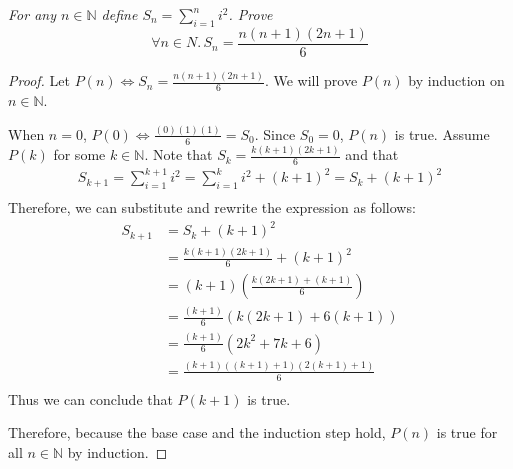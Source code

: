 \documentclass[11pt,largemargins]{homework}
\begin{document}
\question

\textit{For any \(n \in \mathbb{N}\) define \(S_n = \sum_{i = 1}^{n}{i^2}\).
Prove \[\forall n \in N. \, S_n = \frac{n(n + 1)(2n + 1)}{6}\]}

\begin{proof}
  Let \(P(n) \iff S_n = \frac{n(n + 1)(2n + 1)}{6}\). We will prove \(P(n)\) by
  induction on \(n \in \mathbb{N}\).

  \begin{induction}
    \basecase
      When \(n = 0\), \(P(0) \iff \frac{(0)(1)(1)}{6} = S_0\). Since \(S_0 =
      0\), \(P(n)\) is true.
    \indhyp
      Assume \(P(k)\) for some \(k \in \mathbb{N}\).
    \indstep
      Note that \(S_k = \frac{k(k + 1)(2k + 1)}{6}\) and that
      \begin{align*}
        S_{k + 1} = \sum_{i = 1}^{k + 1}{i^2} = \sum_{i = 1}^{k}{i^2} + (k + 1)^2 = S_k + (k + 1)^2 \\
      \end{align*}
      Therefore, we can substitute and rewrite the expression as follows:
      \begin{align*}
        S_{k+1} &= S_k + (k + 1)^2 \\
                &= \frac{k(k + 1)(2k + 1)}{6} + (k + 1)^2 \\
                &= (k + 1)\left(\frac{k(2k + 1) + (k + 1)}{6}\right) \\
                &= \frac{(k + 1)}{6}\left(k(2k + 1) + 6(k + 1)\right) \\
                &= \frac{(k + 1)}{6}(2k^2 + 7k + 6) \\
                &= \frac{(k + 1)((k + 1) + 1)(2(k + 1) + 1)}{6} \\
      \end{align*}
      Thus we can conclude that \(P(k + 1)\) is true.
  \end{induction}
  Therefore, because the base case and the induction step hold, \(P(n)\) is true
  for all \(n \in \mathbb{N}\) by induction.
\end{proof}

\newpage
\question
\end{document}
